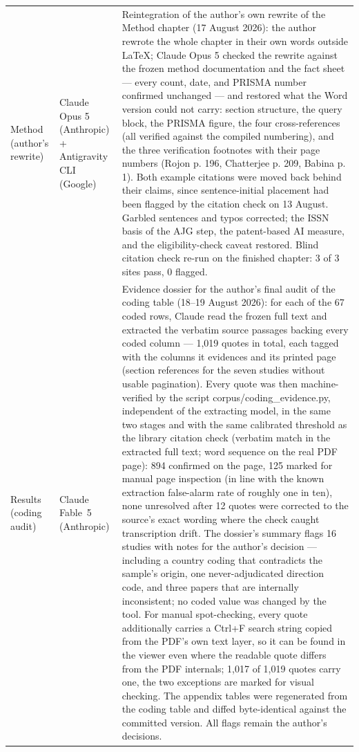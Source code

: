 \begin{longtable}{@{}p{2.9cm}p{3.2cm}p{9.0cm}@{}}
\addlinespace
Method (author's rewrite) & Claude Opus 5 (Anthropic) + Antigravity CLI (Google) & Reintegration of the author's own rewrite of the Method chapter (17 August 2026): the author rewrote the whole chapter in their own words outside LaTeX; Claude Opus 5 checked the rewrite against the frozen method documentation and the fact sheet --- every count, date, and PRISMA number confirmed unchanged --- and restored what the Word version could not carry: section structure, the query block, the PRISMA figure, the four cross-references (all verified against the compiled numbering), and the three verification footnotes with their page numbers (Rojon p. 196, Chatterjee p. 209, Babina p. 1). Both example citations were moved back behind their claims, since sentence-initial placement had been flagged by the citation check on 13 August. Garbled sentences and typos corrected; the ISSN basis of the AJG step, the patent-based AI measure, and the eligibility-check caveat restored. Blind citation check re-run on the finished chapter: 3 of 3 sites pass, 0 flagged. \\
\addlinespace
Results (coding audit) & Claude Fable~5 (Anthropic) & Evidence dossier for the author's final audit of the coding table (18--19 August 2026): for each of the 67 coded rows, Claude read the frozen full text and extracted the verbatim source passages backing every coded column --- 1,019 quotes in total, each tagged with the columns it evidences and its printed page (section references for the seven studies without usable pagination). Every quote was then machine-verified by the script corpus/coding\_evidence.py, independent of the extracting model, in the same two stages and with the same calibrated threshold as the library citation check (verbatim match in the extracted full text; word sequence on the real PDF page): 894 confirmed on the page, 125 marked for manual page inspection (in line with the known extraction false-alarm rate of roughly one in ten), none unresolved after 12 quotes were corrected to the source's exact wording where the check caught transcription drift. The dossier's summary flags 16 studies with notes for the author's decision --- including a country coding that contradicts the sample's origin, one never-adjudicated direction code, and three papers that are internally inconsistent; no coded value was changed by the tool. For manual spot-checking, every quote additionally carries a Ctrl+F search string copied from the PDF's own text layer, so it can be found in the viewer even where the readable quote differs from the PDF internals; 1,017 of 1,019 quotes carry one, the two exceptions are marked for visual checking. The appendix tables were regenerated from the coding table and diffed byte-identical against the committed version. All flags remain the author's decisions. \\

\end{longtable}
